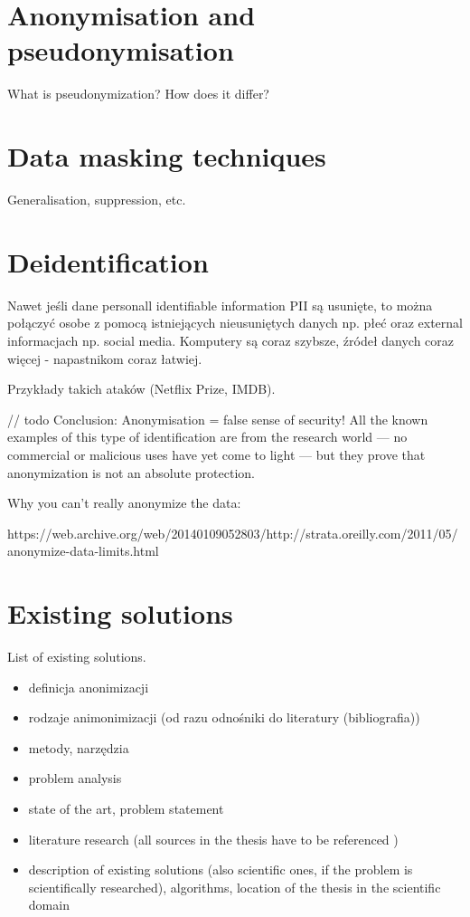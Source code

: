 \documentclass[a4paper,twoside,12pt]{book}
\begin{document}
\section{Anonymisation and pseudonymisation}

\color{blue}
What is pseudonymization? How does it differ?
\color{black}

\section{Data masking techniques}

\color{blue}
Generalisation, suppression, etc.
\color{black}

\section{Deidentification}

\color{blue}
Nawet jeśli dane personall identifiable information PII są usunięte, to można połączyć osobe z pomocą istniejących nieusuniętych danych np. płeć oraz external informacjach np. social media. Komputery są coraz szybsze, źródeł danych coraz więcej - napastnikom coraz łatwiej.

Przykłady takich ataków (Netflix Prize, IMDB).


// todo
Conclusion: Anonymisation = false sense of security! All the known examples of this type of identification are from the research world — no commercial or malicious uses have yet come to light — but they prove that anonymization is not an absolute protection.
\normalsize

Why you can't really anonymize the data:

https://web.archive.org/web/20140109052803/http://strata.oreilly.com/2011/05/anonymize-data-limits.html
\color{black}




\section{Existing solutions}

\color{blue}
List of existing solutions.
\color{black}






\begin{itemize}
	\item definicja anonimizacji
	\item rodzaje animonimizacji (od razu odnośniki do literatury (bibliografia))
	\item metody, narzędzia
\item  problem analysis
\item state of the art, problem statement
\item  literature research (all sources in the thesis have to be referenced \cite{bib:article,bib:book,bib:conference,bib:internet})
\item description of existing solutions (also scientific ones, if the problem is scientifically researched), algorithms,  location of the thesis in the scientific domain
\end{itemize}
\end{document}

